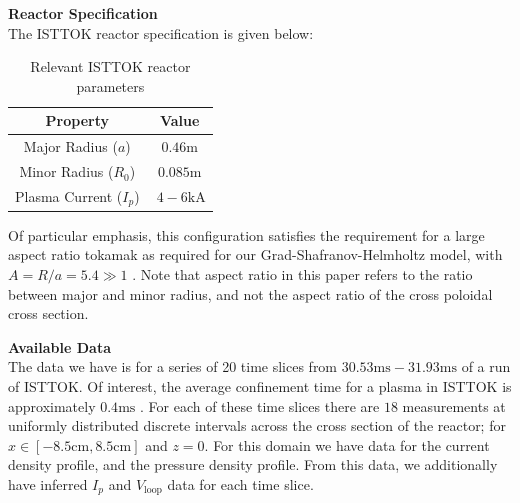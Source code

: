 \noindent\textbf{Reactor Specification}\\
The ISTTOK reactor specification is given below:

\begin{table}[h!]
    \centering
    \begin{tabular}{|c|c|}
    \hline
    Property           & Value                                                 \\ \hline
    Major Radius ($a$)       & $0.46\text{m}$                                                 \\ \hline
    Minor Radius ($R_0$)      & $0.085\text{m}$                                              \\ \hline
    Plasma Current ($I_p$)   & $~4-6\text{kA}$ \\ \hline
    \end{tabular}
    \caption{Relevant ISTTOK reactor parameters \cite{malaquias-matthew}}
\end{table}

Of particular emphasis, this configuration satisfies the requirement for a large aspect ratio tokamak as required for 
our Grad-Shafranov-Helmholtz model, with $A = R / a = 5.4 \gg 1$ \cite{wang-analytic-solution}. Note that 
aspect ratio in this paper refers to the ratio between major and minor radius, and not the aspect ratio of the cross poloidal 
cross section.

\noindent\textbf{Available Data}\\
\noindent
The data we have is for a series of 20 time slices from $30.53\text{ms} - 31.93\text{ms}$ of 
a run of ISTTOK. Of interest, the average confinement time for a plasma in ISTTOK is approximately
$0.4\text{ms}$ \cite{malaquias-matthew}. For each of these time slices there are $18$ 
measurements at uniformly distributed discrete intervals across the cross section of the reactor; 
for $x \in [-8.5\text{cm}, 8.5\text{cm}]$ and $z = 0$. For this domain we have data for the 
current density profile, and the pressure density profile. From this data, we additionally have inferred $I_p$ and $V_{\text{loop}}$ data for each time slice.

